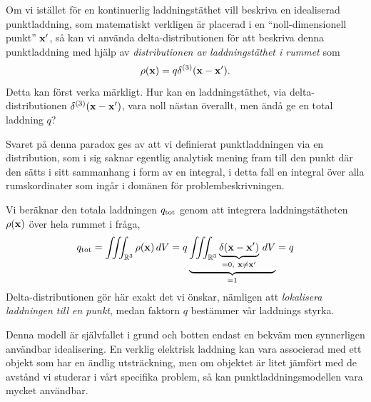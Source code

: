 Om vi ist{\"a}llet f{\"o}r en kontinuerlig laddningst{\"a}thet vill beskriva
en idealiserad punktladdning, som matematiskt verkligen {\"a}r placerad i en
``noll-dimensionell punkt'' ${\bf x}'$, s{\aa} kan vi anv{\"a}nda
delta-distributionen f{\"o}r att beskriva denna punktladdning med hj{\"a}lp
av {\it distributionen av laddningst{\"a}thet i rummet} som
$$
  \rho({\bf x})=q\delta^{(3)}({\bf x}-{\bf x}').
$$
Detta kan f{\"o}rst verka m{\"a}rkligt. Hur kan en laddningst{\"a}thet, via
delta-distributionen $\delta^{(3)}({\bf x}-{\bf x}')$, vara noll n{\"a}stan
{\"o}verallt, men {\"a}nd{\aa} ge en total laddning $q$?

Svaret p{\aa} denna paradox
ges av att vi definierat punktladdningen via en distribution, som i sig saknar
egentlig analytisk mening fram till den punkt d{\"a}r den s{\"a}tts i sitt
sammanhang i form av en integral, i detta fall en integral {\"o}ver alla
rumskordinater som ing{\aa}r i dom{\"a}nen f{\"o}r problembeskrivningen.

Vi ber{\"a}knar den totala laddningen $q_{\rm tot}$ genom att integrera
laddningst{\"a}theten $\rho({\bf x})$ {\"o}ver hela rummet i
fr{\aa}ga,
$$
  q_{\rm tot}
    =\iiint_{{\Bbb R}^3}\rho({\bf x})\,dV
    =q\underbrace{
         \iiint_{{\Bbb R}^3}
           \underbrace{
             \delta({\bf x}-{\bf x}')
           }_{=0,\ {\bf x}\ne{\bf x}'}
           \,dV
       }_{=1}
    =q
$$
Delta-distributionen g{\"o}r h{\"a}r exakt det vi {\"o}nskar, n{\"a}mligen att
{\it lokalisera laddningen till en punkt}, medan faktorn $q$ best{\"a}mmer
v{\aa}r laddnings styrka.

Denna modell {\"a}r sj{\"a}lvfallet i grund och botten endast en bekv{\"a}m
men synnerligen anv{\"a}ndbar idealisering. En verklig elektrisk laddning kan
vara associerad med ett objekt som har en {\"a}ndlig utstr{\"a}ckning, men om
objektet {\"a}r litet j{\"a}mf{\"o}rt med de avst{\aa}nd vi studerar i v{\aa}rt
specifika problem, s{\aa} kan punktladdningsmodellen vara mycket anv{\"a}ndbar.

